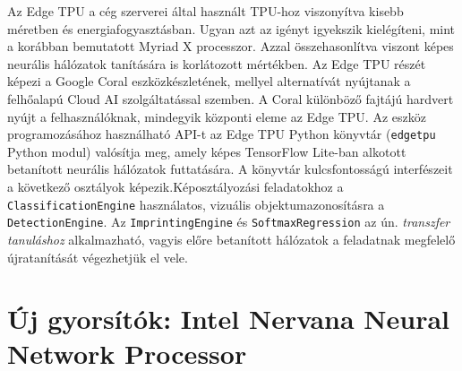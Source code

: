 Az Edge TPU a cég szerverei által használt TPU-hoz viszonyítva kisebb méretben és energiafogyasztásban. Ugyan azt az igényt igyekszik kielégíteni, mint a korábban bemutatott Myriad X processzor. Azzal összehasonlítva viszont képes neurális hálózatok tanítására is korlátozott mértékben. Az Edge TPU részét képezi a Google Coral eszközkészletének, mellyel alternatívát nyújtanak a felhőalapú Cloud AI szolgáltatással szemben. A Coral különböző fajtájú hardvert nyújt a felhasználóknak, mindegyik központi eleme az Edge TPU. Az eszköz programozásához használható API-t az Edge TPU Python könyvtár (\verb|edgetpu| Python modul) valósítja meg, amely képes TensorFlow Lite-ban alkotott betanított neurális hálózatok futtatására. A könyvtár kulcsfontosságú interfészeit a következő osztályok képezik.Képosztályozási feladatokhoz a \verb|ClassificationEngine| használatos, vizuális objektumazonosításra a \verb|DetectionEngine|. Az \verb|ImprintingEngine| és \verb|SoftmaxRegression| az ún. \emph{transzfer tanuláshoz} alkalmazható, vagyis előre betanított hálózatok a feladatnak megfelelő újratanítását végezhetjük el vele.


\section{Új gyorsítók: Intel Nervana Neural Network Processor}


